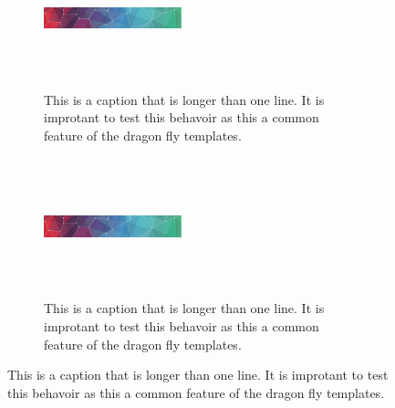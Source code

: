 \documentclass{dragonfly-report}
\begin{document}
\begin{figure}[h]

  \begin{subfigure}{0.45\textwidth}
  \includegraphics[width=40mm,height=40mm]{pattern}
  \caption{This is a caption that is longer than one line. It is improtant to test 
  this behavoir as this a common feature of the dragon fly templates.}
\end{subfigure}\qquad
  \begin{subfigure}{0.45\textwidth}
  \includegraphics[width=40mm,height=40mm]{pattern}
  \caption{This is a caption that is longer than one line. It is improtant to test 
  this behavoir as this a common feature of the dragon fly templates.}
\end{subfigure}

\end{figure}
\end{document}
